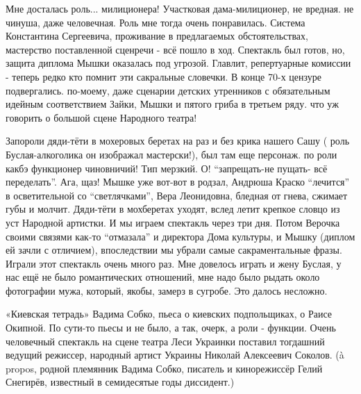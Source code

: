 
Мне досталась
роль... милиционера! Участковая дама-милиционер, не вредная. не чинуша, даже
человечная. Роль мне тогда очень понравилась.  Система Константина Сергеевича,
проживание в предлагаемых обстоятельствах, мастерство поставленной сценречи -
всё пошло в ход. Спектакль был готов, но, защита диплома Мышки оказалась под
угрозой. Главлит, репертуарные комиссии - теперь редко кто помнит эти
сакральные словечки. В конце 70-х цензуре подвергались. по-моему, даже сценарии
детских утренников с обязательным идейным соответствием Зайки, Мышки и пятого
гриба в третьем ряду. что уж говорить о большой сцене Народного театра!

\raggedcolumns
\begin{multicols}{2} %
\setlength{\parindent}{0pt}



\end{multicols} %


Запороли дяди-тёти в мохеровых беретах на раз и без крика нашего Сашу ( роль
Буслая-алкоголика он изображал мастерски!), был там еще персонаж. по роли
какбэ функционер чиновничий! Тип мерзкий. О! \enquote{запрещать-не пущать- всё
переделать}. Ага, щаз! Мышке уже вот-вот в родзал, Андрюша Краско \enquote{лечится} в
осветительной со \enquote{светлячками}, Вера Леонидовна, бледная от гнева, сжимает
губы и молчит. Дяди-тёти в мохберетах уходят, вслед летит крепкое словцо из уст
Народной артистки. И мы играем спектакль через три дня. Потом Верочка своими
связями как-то \enquote{отмазала} и директора Дома культуры, и Мышку (диплом ей зачли с
отличием),  впоследствии мы убрали самые сакраментальные фразы. Играли этот
спектакль  очень много раз. Мне довелось играть и жену Буслая, у нас ещё не
было романтических отношений, мне надо было рыдать около фотографии мужа,
который, якобы, замерз в сугробе. Это далось несложно.


«Киевская тетрадь» Вадима Собко, пьеса о киевских подпольщиках, о Раисе
Окипной. По сути-то пьесы и не было, а так, очерк, а роли - функции. Очень
человечный спектакль на сцене театра Леси Украинки поставил тогдашний ведущий
режиссер, народный артист Украины Николай Алексеевич Соколов.  (à propos,
родной племянник Вадима Собко, писатель и кинорежиссёр Гелий Снегирёв,
известный в семидесятые годы диссидент.)

